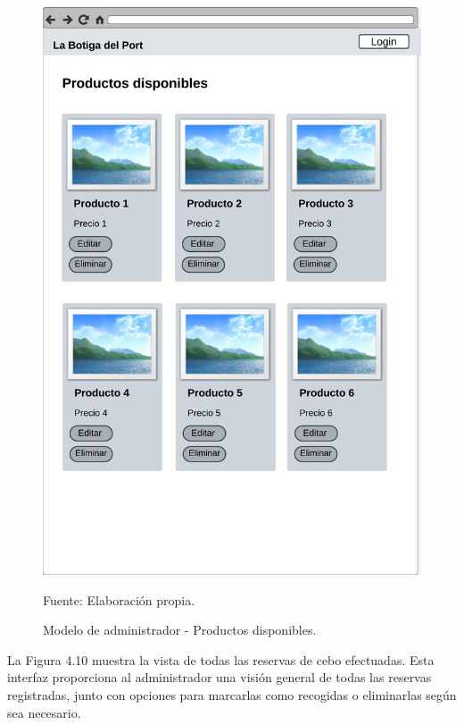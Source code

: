 \begin{figure}[H]
\begin{center}
\includegraphics[scale=0.5]{./Images/productos_disponibles.png}
\caption{Modelo de administrador - Productos disponibles.} Fuente: Elaboración propia.

\label{fig:fig9}

\end{center}
\end{figure}

La Figura 4.10 muestra la vista de todas las reservas de cebo efectuadas. Esta interfaz proporciona al administrador una visión general de todas las reservas registradas, junto con opciones para marcarlas como recogidas o eliminarlas según sea necesario.

